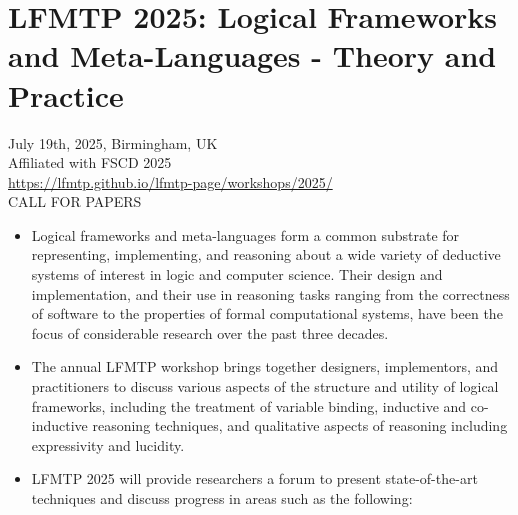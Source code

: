 \documentclass[prodmode,acmtecs]{acmsmall} %
\begin{document}
\section{LFMTP 2025: Logical Frameworks and Meta-Languages - Theory and Practice}\label{LFMTP2025}  July 19th, 2025, Birmingham, UK\\ 
  Affiliated with FSCD 2025\\ 
  \href{https://lfmtp.github.io/lfmtp-page/workshops/2025/}{https://lfmtp.github.io/lfmtp-page/workshops/2025/}\\ 
CALL FOR PAPERS 

\begin{itemize}\item  Logical frameworks and meta-languages form a common substrate for representing, implementing, and reasoning about a wide variety of deductive systems of interest in logic and computer science. Their design and implementation, and their use in reasoning tasks ranging from the correctness of software to the properties of formal computational systems, have been the focus of considerable research over the past three decades. 
 
\item  The annual LFMTP workshop brings together designers, implementors, and practitioners to discuss various aspects of the structure and utility of logical frameworks, including the treatment of variable binding, inductive and co-inductive reasoning techniques, and qualitative aspects of reasoning including expressivity and lucidity. 
 
\item  LFMTP 2025 will provide researchers a forum to present state-of-the-art techniques and discuss progress in areas such as the following: 
 

\end{itemize}
\end{document}
